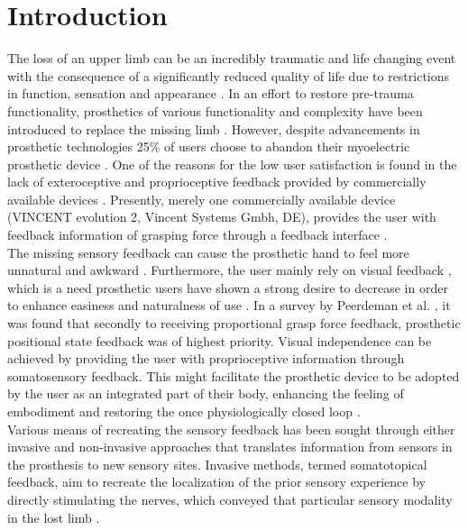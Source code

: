 \chapter{Introduction}

The loss of an upper limb can be an incredibly traumatic and life changing event with the consequence of a significantly reduced quality of life due to restrictions in function, sensation and appearance \cite{Schofield2014,Ostlie2011}. 
In an effort to restore pre-trauma functionality, prosthetics of various functionality and complexity have been introduced to replace the missing limb \cite{Geethanjali2016}. However, despite advancements in prosthetic technologies 25\% of users choose to abandon their myoelectric prosthetic device \cite{Biddiss2007a}. One of the reasons for the low user satisfaction is found in the lack of exteroceptive and proprioceptive feedback provided by commercially available devices \cite{Peerdeman2011}. Presently, merely one commercially available device (VINCENT evolution 2, Vincent Systems Gmbh, DE), provides the user with feedback information of grasping force through a feedback interface \cite{Systems2005}. \\    
%
The missing sensory feedback can cause the prosthetic hand to feel more unnatural and awkward \cite{Pamungkas2015}. Furthermore, the user mainly rely on visual feedback \cite{Pamungkas2015,Stephens-Fripp2018}, which is a need prosthetic users have shown a strong desire to decrease in order to enhance easiness and naturalness of use \cite{Atkins1996}.
In a survey by Peerdeman et al. \cite{Peerdeman2011}, it was found that secondly to receiving proportional grasp force feedback, prosthetic positional state feedback was of highest priority. Visual independence can be achieved by providing the user with proprioceptive information through somatosensory feedback. This might facilitate the prosthetic device to be adopted by the user as an integrated part of their body, enhancing the feeling of embodiment and restoring the once physiologically closed loop \cite{Stephens-Fripp2018,Xu2016,Strbac2016,Geng2012}. \\
%
Various means of recreating the sensory feedback has been sought through either invasive and non-invasive approaches that translates information from sensors in the prosthesis to new sensory sites. Invasive methods, termed somatotopical feedback, aim to recreate the localization of the prior sensory experience by directly stimulating the nerves, which conveyed that particular sensory modality in the lost limb \cite{Schofield2014,Stephens-Fripp2018}.
